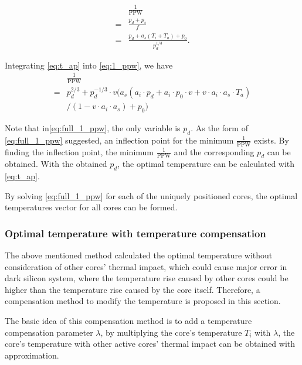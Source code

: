 \begin{equation}\label{eq:1_ppw}
\begin{split}
&\frac{1}{\text{PPW}}\\
=&\frac{p_{d}+p_{s}}{f}\\
=&\frac{p_{d}+a_{s}(T_{i}+T_{a})+p_{0}}{p_{d}^{1/3}}.
\end{split}
\end{equation}

Integrating \eqref{eq:t_ap} into \eqref{eq:1_ppw}, we have
\begin{equation}\label{eq:full_1_ppw}
\begin{split}
&\frac{1}{\text{PPW}}\\
=&p_{d}^{2/3}+p_{d}^{-1/3}\cdot v(a_{s}(a_{i} \cdot p_{d}+a_{i} \cdot p_{0} \cdot v+v \cdot a_{i} \cdot a_{s} \cdot T_{a})\\
&/(1-v \cdot a_{i} \cdot a_{s})+p_{0})
\end{split}
\end{equation}

Note that in\eqref{eq:full_1_ppw}, the only variable is $p_{d}$. As the form of \eqref{eq:full_1_ppw} suggested, an inflection point for the minimum $\frac{1}{\text{PPW}}$ exists. By finding the inflection point, the minimum $\frac{1}{\text{PPW}}$ and the corresponding $p_{d}$ can be obtained. With the obtained $p_{d}$, the optimal temperature can be calculated with \eqref{eq:t_ap}.

By solving \eqref{eq:full_1_ppw} for each of the uniquely positioned cores, the optimal temperatures vector for all cores can be formed.


\subsubsection{Optimal temperature with temperature compensation}
The above mentioned method calculated the optimal temperature without consideration of other cores' thermal impact, which could cause major error in dark silicon system, where the temperature rise caused by other cores could be higher than the temperature rise caused by the core itself. Therefore, a compensation method to modify the temperature is proposed in this section.

The basic idea of this compensation method is to add a temperature compensation parameter $\lambda$, by multiplying the core's temperature $T_{i}$ with $\lambda$, the core's temperature with other active cores' thermal impact can be obtained with approximation.

